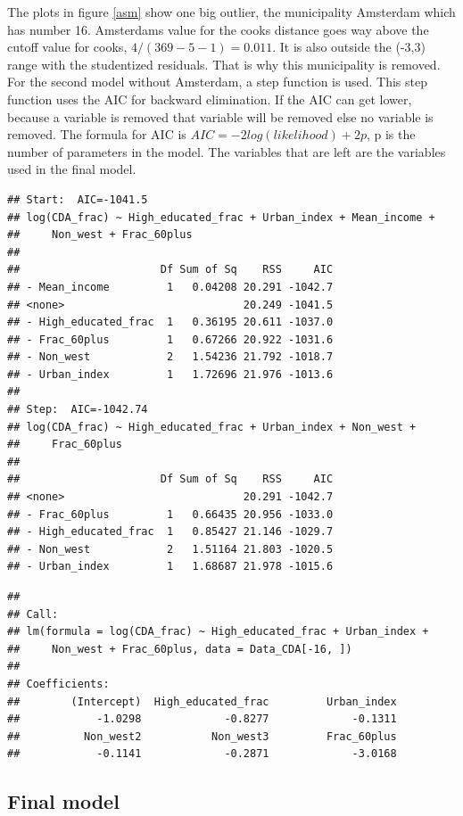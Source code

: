 \documentclass[11pt,]{article}
\begin{document}
The plots in figure \ref{asm} show one big outlier, the municipality
Amsterdam which has number 16. Amsterdams value for the cooks distance
goes way above the cutoff value for cooks, \(4/(369-5-1)=0.011\). It is
also outside the (-3,3) range with the studentized residuals. That is
why this municipality is removed.\\
For the second model without Amsterdam, a step function is used. This
step function uses the AIC for backward elimination. If the AIC can get
lower, because a variable is removed that variable will be removed else
no variable is removed. The formula for AIC is
\(AIC=-2log(likelihood)+2p\), p is the number of parameters in the
model. The variables that are left are the variables used in the final
model.

\begin{verbatim}
## Start:  AIC=-1041.5
## log(CDA_frac) ~ High_educated_frac + Urban_index + Mean_income + 
##     Non_west + Frac_60plus
## 
##                      Df Sum of Sq    RSS     AIC
## - Mean_income         1   0.04208 20.291 -1042.7
## <none>                            20.249 -1041.5
## - High_educated_frac  1   0.36195 20.611 -1037.0
## - Frac_60plus         1   0.67266 20.922 -1031.6
## - Non_west            2   1.54236 21.792 -1018.7
## - Urban_index         1   1.72696 21.976 -1013.6
## 
## Step:  AIC=-1042.74
## log(CDA_frac) ~ High_educated_frac + Urban_index + Non_west + 
##     Frac_60plus
## 
##                      Df Sum of Sq    RSS     AIC
## <none>                            20.291 -1042.7
## - Frac_60plus         1   0.66435 20.956 -1033.0
## - High_educated_frac  1   0.85427 21.146 -1029.7
## - Non_west            2   1.51164 21.803 -1020.5
## - Urban_index         1   1.68687 21.978 -1015.6
\end{verbatim}

\begin{verbatim}
## 
## Call:
## lm(formula = log(CDA_frac) ~ High_educated_frac + Urban_index + 
##     Non_west + Frac_60plus, data = Data_CDA[-16, ])
## 
## Coefficients:
##        (Intercept)  High_educated_frac         Urban_index  
##            -1.0298             -0.8277             -0.1311  
##          Non_west2           Non_west3         Frac_60plus  
##            -0.1141             -0.2871             -3.0168
\end{verbatim}

\subsection{Final model}\label{final-model}
\end{document}
